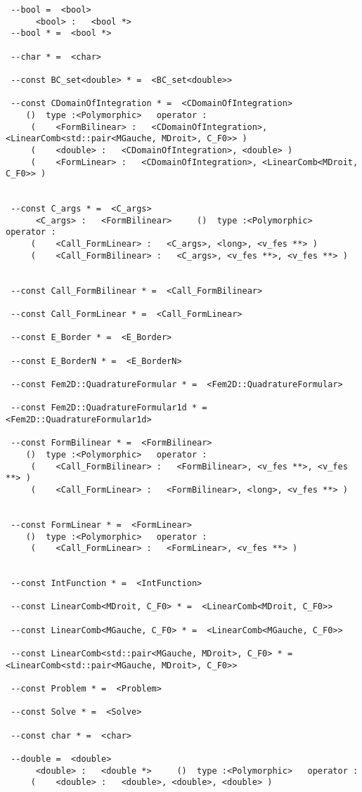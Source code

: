 \documentclass[twoside]{book}
\begin{document}
\begin{verbatim}
 --bool =  <bool>
	  <bool> :   <bool *> 
 --bool * =  <bool *>

 --char * =  <char>

 --const BC_set<double> * =  <BC_set<double>>

 --const CDomainOfIntegration * =  <CDomainOfIntegration>
    ()  type :<Polymorphic>   operator : 
	 (	  <FormBilinear> :   <CDomainOfIntegration>, <LinearComb<std::pair<MGauche, MDroit>, C_F0>> )
	 (	  <double> :   <CDomainOfIntegration>, <double> )
	 (	  <FormLinear> :   <CDomainOfIntegration>, <LinearComb<MDroit, C_F0>> )


 --const C_args * =  <C_args>
	  <C_args> :   <FormBilinear>     ()  type :<Polymorphic>   operator : 
	 (	  <Call_FormLinear> :   <C_args>, <long>, <v_fes **> )
	 (	  <Call_FormBilinear> :   <C_args>, <v_fes **>, <v_fes **> )


 --const Call_FormBilinear * =  <Call_FormBilinear>

 --const Call_FormLinear * =  <Call_FormLinear>

 --const E_Border * =  <E_Border>

 --const E_BorderN * =  <E_BorderN>

 --const Fem2D::QuadratureFormular * =  <Fem2D::QuadratureFormular>

 --const Fem2D::QuadratureFormular1d * =  <Fem2D::QuadratureFormular1d>

 --const FormBilinear * =  <FormBilinear>
    ()  type :<Polymorphic>   operator : 
	 (	  <Call_FormBilinear> :   <FormBilinear>, <v_fes **>, <v_fes **> )
	 (	  <Call_FormLinear> :   <FormBilinear>, <long>, <v_fes **> )


 --const FormLinear * =  <FormLinear>
    ()  type :<Polymorphic>   operator : 
	 (	  <Call_FormLinear> :   <FormLinear>, <v_fes **> )


 --const IntFunction * =  <IntFunction>

 --const LinearComb<MDroit, C_F0> * =  <LinearComb<MDroit, C_F0>>

 --const LinearComb<MGauche, C_F0> * =  <LinearComb<MGauche, C_F0>>

 --const LinearComb<std::pair<MGauche, MDroit>, C_F0> * =  <LinearComb<std::pair<MGauche, MDroit>, C_F0>>

 --const Problem * =  <Problem>

 --const Solve * =  <Solve>

 --const char * =  <char>

 --double =  <double>
	  <double> :   <double *>     ()  type :<Polymorphic>   operator : 
	 (	  <double> :   <double>, <double>, <double> )



\end{verbatim}
\end{document}
